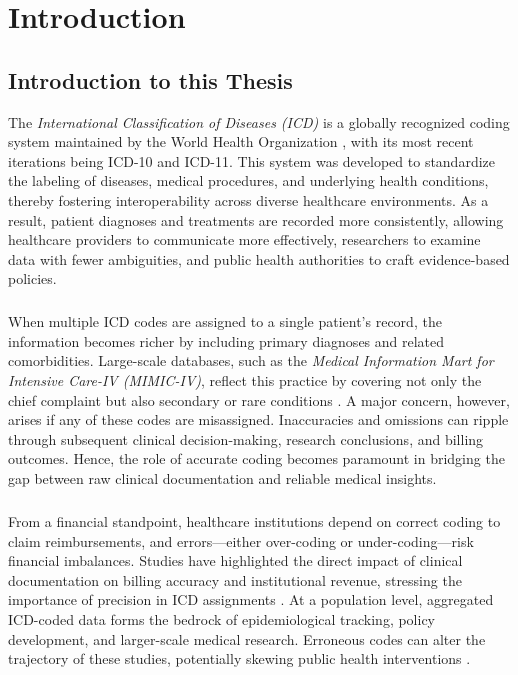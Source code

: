 \chapter{Introduction}
\label{chap:introduction}

\section{Introduction to this Thesis}
The \emph{International Classification of Diseases (ICD)} is a globally recognized coding system maintained by the World Health Organization \citep{who2019icd11}, with its most recent iterations being ICD-10 and ICD-11. This system was developed to standardize the labeling of diseases, medical procedures, and underlying health conditions, thereby fostering interoperability across diverse healthcare environments. As a result, patient diagnoses and treatments are recorded more consistently, allowing healthcare providers to communicate more effectively, researchers to examine data with fewer ambiguities, and public health authorities to craft evidence-based policies.

\paragraph{}
When multiple ICD codes are assigned to a single patient’s record, the information becomes richer by including primary diagnoses and related comorbidities. Large-scale databases, such as the \emph{Medical Information Mart for Intensive Care-IV (MIMIC-IV)}, reflect this practice by covering not only the chief complaint but also secondary or rare conditions \citep{johnson2023mimicivscidata}. A major concern, however, arises if any of these codes are misassigned. Inaccuracies and omissions can ripple through subsequent clinical decision-making, research conclusions, and billing outcomes. Hence, the role of accurate coding becomes paramount in bridging the gap between raw clinical documentation and reliable medical insights.

\paragraph{}
From a financial standpoint, healthcare institutions depend on correct coding to claim reimbursements, and errors—either over-coding or under-coding—risk financial imbalances. Studies have highlighted the direct impact of clinical documentation on billing accuracy and institutional revenue, stressing the importance of precision in ICD assignments \citep{dong2022automated}. At a population level, aggregated ICD-coded data forms the bedrock of epidemiological tracking, policy development, and larger-scale medical research. Erroneous codes can alter the trajectory of these studies, potentially skewing public health interventions \citep{edin2023automated}.

